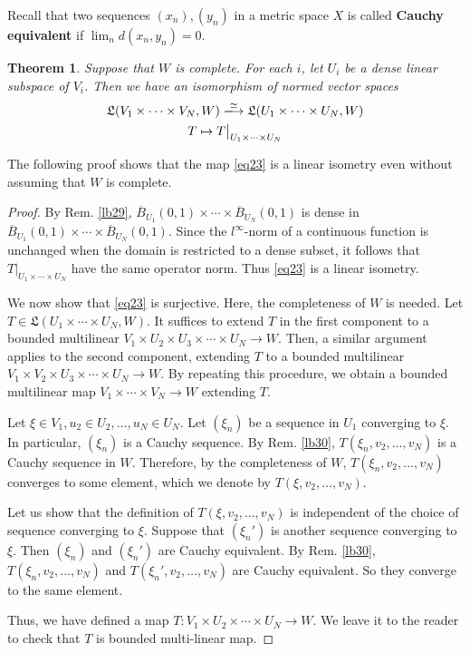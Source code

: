 \documentclass[12pt,b5paper,notitlepage]{article}
\theoremstyle{definition}
\theoremstyle{plain}
\newtheorem{thm}[df]{Theorem}
\newcommand{\fk}{\mathfrak}
\newcommand{\ovl}{\overline}
\numberwithin{equation}{section}
\begin{document}
Recall that two sequences $(x_n),(y_n)$ in a metric space $X$ is called \textbf{Cauchy equivalent}  if $\lim_n d(x_n,y_n)=0$.


\begin{thm}\label{lb31}
Suppose that $W$ is complete. For each $i$, let $U_i$ be a dense linear subspace of $V_i$. Then we have an isomorphism of normed vector spaces
\begin{gather}\label{eq23}
\begin{gathered}
\fk L(V_1\times\cdots\times V_N,W)\xlongrightarrow{\simeq} \fk L(U_1\times\cdots\times U_N,W)\\
T\mapsto T\big|_{U_1\times\cdots\times U_N}
\end{gathered}
\end{gather}
\end{thm}

The following proof shows that the map \eqref{eq23} is a linear isometry even without assuming that $W$ is complete.


\begin{proof}
By Rem. \ref{lb29}, $\ovl B_{U_1}(0,1)\times\cdots\times\ovl B_{U_N}(0,1)$ is dense in $\ovl B_{U_1}(0,1)\times\cdots\times\ovl B_{U_N}(0,1)$. Since the $l^\infty$-norm of a continuous function is unchanged when the domain is restricted to a dense subset, it follows that $T\big|_{U_1\times\cdots\times U_N}$ have the same operator norm. Thus \eqref{eq23} is a linear isometry.

We now show that \eqref{eq23} is surjective. Here, the completeness of $W$ is needed. Let $T\in \fk L(U_1\times\cdots\times U_N,W)$. It suffices to extend $T$ in the first component to a bounded multilinear $V_1\times U_2\times U_3\times\cdots\times U_N\rightarrow W$. Then, a similar argument applies to the second component, extending $T$ to a bounded multilinear $V_1\times V_2\times U_3\times\cdots\times U_N\rightarrow W$. By repeating this procedure, we obtain a bounded multilinear map $V_1\times\cdots\times V_N\rightarrow W$ extending $T$.

Let $\xi\in V_1,u_2\in U_2,\dots,u_N\in U_N$. Let $(\xi_n)$ be a sequence in $U_1$ converging to $\xi$. In particular, $(\xi_n)$ is a Cauchy sequence. By Rem. \ref{lb30}, $T(\xi_n,v_2,\dots,v_N)$ is a Cauchy sequence in $W$. Therefore, by the completeness of $W$, $T(\xi_n,v_2,\dots,v_N)$ converges to some element, which we denote by $T(\xi,v_2,\dots,v_N)$.

Let us show that the definition of $T(\xi,v_2,\dots,v_N)$ is independent of the choice of sequence converging to $\xi$. Suppose that $(\xi_n')$ is another sequence converging to $\xi$. Then $(\xi_n)$ and $(\xi_n')$ are Cauchy equivalent. By Rem. \ref{lb30}, $T(\xi_n,v_2,\dots,v_N)$ and $T(\xi_n',v_2,\dots,v_N)$ are Cauchy equivalent. So they converge to the same element.

Thus, we have defined a map $T:V_1\times U_2\times\cdots\times U_N\rightarrow W$. We leave it to the reader to check that $T$ is bounded multi-linear map.
\end{proof}
\end{document}
